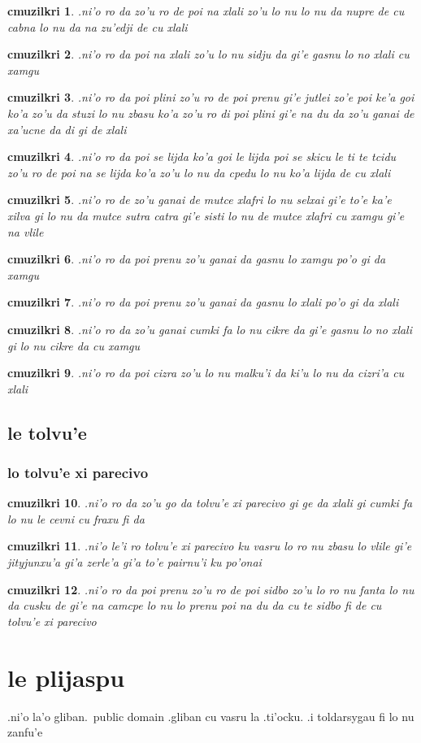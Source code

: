\documentclass{report}
\newtheorem{cmuzilkri}{cmuzilkri}
\begin{document}
\begin{cmuzilkri}
	.ni'o ro da zo'u ro de poi na xlali zo'u lo nu lo nu da nupre de cu cabna lo nu da na zu'edji de cu xlali
\end{cmuzilkri}
\begin{cmuzilkri}
	.ni'o ro da poi na xlali zo'u lo nu sidju da gi'e gasnu lo no xlali cu xamgu
\end{cmuzilkri}
\begin{cmuzilkri}
	.ni'o ro da poi plini zo'u ro de poi prenu gi'e jutlei zo'e poi ke'a goi ko'a zo'u da stuzi lo nu zbasu ko'a zo'u ro di poi plini gi'e na du da zo'u ganai de xa'ucne da di gi de xlali
\end{cmuzilkri}
\begin{cmuzilkri}
	.ni'o ro da poi se lijda ko'a goi le lijda poi se skicu le ti te tcidu zo'u ro de poi na se lijda ko'a zo'u lo nu da cpedu lo nu ko'a lijda de cu xlali
\end{cmuzilkri}
\begin{cmuzilkri}
	.ni'o ro de zo'u ganai de mutce xlafri lo nu selxai gi'e to'e ka'e xilva gi lo nu da mutce sutra catra gi'e sisti lo nu de mutce xlafri cu xamgu gi'e na vlile
\end{cmuzilkri}
\begin{cmuzilkri}
	.ni'o ro da poi prenu zo'u ganai da gasnu lo xamgu po'o gi da xamgu
\end{cmuzilkri}
\begin{cmuzilkri}
	.ni'o ro da poi prenu zo'u ganai da gasnu lo xlali po'o gi da xlali
\end{cmuzilkri}
\begin{cmuzilkri}
	.ni'o ro da zo'u ganai cumki fa lo nu cikre da gi'e gasnu lo no xlali gi lo nu cikre da cu xamgu
\end{cmuzilkri}
\begin{cmuzilkri}
	.ni'o ro da poi cizra zo'u lo nu malku'i da ki'u lo nu da cizri'a cu xlali
\end{cmuzilkri}

\section{le tolvu'e}
\subsection{lo tolvu'e xi parecivo}
\begin{cmuzilkri}
	.ni'o ro da zo'u go da tolvu'e xi parecivo gi ge da xlali gi cumki fa lo nu le cevni cu fraxu fi da
\end{cmuzilkri}
\begin{cmuzilkri}
	.ni'o le'i ro tolvu'e xi parecivo ku vasru lo ro nu zbasu lo vlile gi'e jityjunxu'a gi'a zerle'a gi'a to'e pairnu'i ku po'onai
\end{cmuzilkri}
\begin{cmuzilkri}
	.ni'o ro da poi prenu zo'u ro de poi sidbo zo'u lo ro nu fanta lo nu da cusku de gi'e na camcpe lo nu lo prenu poi na du da cu te sidbo fi de cu tolvu'e xi parecivo
\end{cmuzilkri}

\chapter{le plijaspu}
.ni'o la'o gliban.\ public domain .gliban cu vasru la .ti'ocku.  .i toldarsygau fi lo nu zanfu'e
\end{document}
